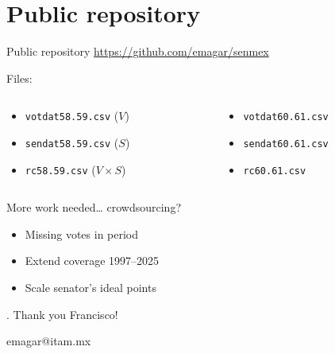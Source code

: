 \documentclass[bigger]{beamer}
\begin{document}
\section{Public repository}
\label{sec:org88e7eea}
\begin{frame}[label={sec:orgcba42a6},fragile]{Public repository}
 \url{https://github.com/emagar/senmex}
\bigskip \pause
\begin{block}{Files:}
\begin{columns}
\begin{column}{0.5\columnwidth}
\begin{itemize}
\item \texttt{votdat58.59.csv} (\(V\))
\item \texttt{sendat58.59.csv} (\(S\))
\item \texttt{rc58.59.csv}  (\(V \times S\))
\end{itemize}
\end{column}
\begin{column}{0.5\columnwidth}
\begin{itemize}
\item \texttt{votdat60.61.csv}
\item \texttt{sendat60.61.csv}
\item \texttt{rc60.61.csv} \pause \bigskip
\end{itemize}
\end{column}
\end{columns}
\end{block}
\begin{block}{More work needed\ldots{} crowdsourcing?}
\begin{itemize}
\item Missing votes in period
\item Extend coverage 1997--2025
\item Scale senator's ideal points
\end{itemize}
\end{block}
\end{frame}
\begin{frame}[label={sec:org8d70546}]{.}
\centering 
Thank you \alert{Francisco}!

emagar@itam.mx
\end{frame}
\end{document}
